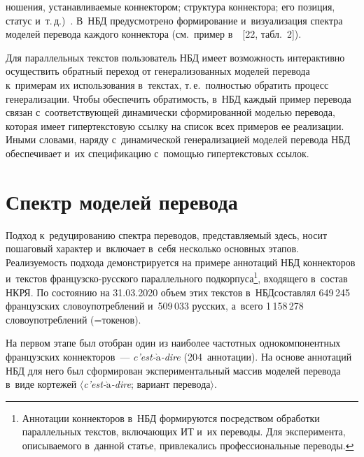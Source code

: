\begin{multicols}{2}

\noindent
 ношения, уста\-нав\-ли\-ва\-емые коннектором; 
структура коннектора; 
его позиция, статус и~т.\,д.)~\cite{21-nur}. В~НБД предусмот\-ре\-но формирование 
и~визуализация спект\-ра моделей перевода каждого коннектора (см.\ пример 
в~~[22, табл.~2]).
     
     Для параллельных текстов пользователь НБД имеет возможность 
интерактивно осуществить обратный переход от генерализованных моделей 
перевода к~примерам их использования в~текстах, т.\,е.\ полностью обратить 
процесс генерализации. Чтобы обеспечить обратимость, в~НБД каждый пример 
перевода связан с~соответствующей динамически сформированной моделью 
перевода, которая имеет гипертекстовую ссылку на список всех примеров ее 
реализации. Иными словами, наряду с~динамической генерализацией моделей 
перевода НБД обеспечивает и~их спецификацию с~помощью гипертекстовых 
ссылок\cite{21-nur}.

\vspace*{-10pt}
  
  \section{Спектр моделей перевода}
  
  \vspace*{-3pt}
  
  Подход к~редуцированию спектра переводов, представляемый здесь, носит 
пошаговый характер и~включает в~себя несколько основных этапов. 
Реализуемость подхода демонстрируется на примере аннотаций НБД коннекторов 
и~текс\-тов фран\-цуз\-ско-рус\-ско\-го 
параллельного подкорпуса\footnote{Аннотации 
коннекторов в~НБД формируются по\-сред\-ст\-вом обработки параллельных текстов, включающих ИТ и~их 
переводы. Для эксперимента, описываемого в~данной статье,
 привлекались профессиональные 
переводы.}, входящего в~состав НКРЯ. По со\-сто\-янию на 31.03.2020 объем этих 
текстов в~НБД\linebreak составлял 649\,245 французских словоупотреблений и~509\,033 
русских, а~всего 1\,158\,278 словоупотреблений (=\;токенов). 
{ %

}

На первом этапе 
был отобран один из наиболее частотных однокомпонентных французских 
коннекторов~--- \textit{c'est-$\grave{\mbox{a}}$-dire} (204~аннотации). На основе 
аннотаций НБД для него был сформирован экспериментальный массив моделей 
перевода в~виде кортежей  
$\langle$\textit{c'est-$\grave{\mbox{a}}$-dire}; вариант перевода$\rangle$. 



\end{multicols}
